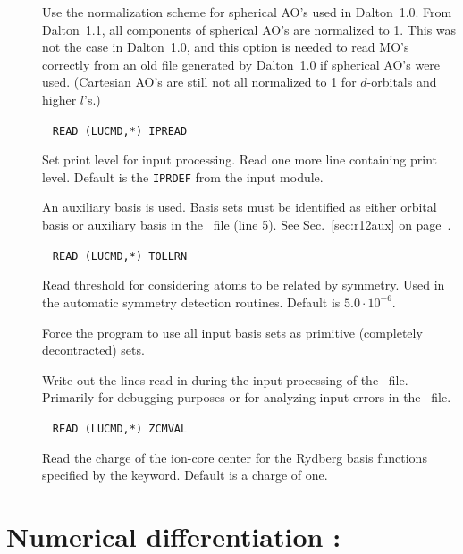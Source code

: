 \begin{description}
\item[] Use the normalization scheme for spherical AO's used in Dalton~1.0.
From Dalton~1.1, all components of spherical AO's are normalized to 1.
This was not the case in Dalton~1.0, and this option is needed to read
MO's correctly from an old file generated by Dalton~1.0 if spherical AO's were used.
(Cartesian AO's are still not all normalized to 1 for $d$-orbitals and higher $l$'s.)

\item[]\verb| |\newline
\verb|READ (LUCMD,*) IPREAD|

Set print level for input processing.  Read one more line containing
print level. Default is the \verb|IPRDEF| from the  input
module.

\item[] An auxiliary basis is used.
Basis sets must be identified as either orbital basis or
auxiliary basis in the \molinp\ file (line 5).
See Sec.~\ref{sec:r12aux} on page~\pageref{sec:r12aux}.

\item[]\verb| |\newline
\verb|READ (LUCMD,*) TOLLRN|

Read threshold for considering atoms to be related by symmetry. Used
in the automatic symmetry detection routines. Default is $5.0\cdot
10^{-6}$.

\item[] Force the program to use all input basis sets as primitive (completely decontracted) sets.

\item[] Write out the lines read in during the input
  processing of the \molinp\ file. Primarily for debugging
  purposes or for analyzing input errors in the \molinp\
  file.

\item[]\verb| |\newline
\verb|READ (LUCMD,*) ZCMVAL|

Read the charge of the ion-core center for the Rydberg basis functions specified
by the \Key{CM FUN} keyword. Default is a charge of one.

\end{description}

\section{Numerical differentiation : }\label{sec:nmddrv}

